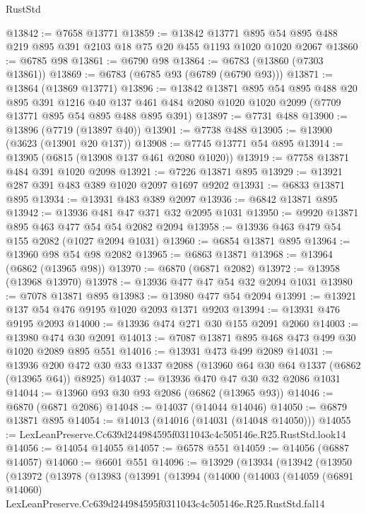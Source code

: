 \begin{lexlean}{RustStd}
\begin{coremodule}
@13842 := @7658 @13771
@13859 := @13842
    @13771
    @895
    @54
    @895
    @488
    @219
    @895
    @391
    @2103
    @18
    @75
    @20
    @455
    @1193
    @1020
    @1020
    @2067
@13860 := @6785 @98
@13861 := @6790 @98
@13864 := @6783 (@13860 (@7303 @13861))
@13869 := @6783 (@6785 @93 (@6789 (@6790 @93)))
@13871 := @13864 (@13869 @13771)
@13896 := @13842
    @13871
    @895
    @54
    @895
    @488
    @20
    @895
    @391
    @1216
    @40
    @137
    @461
    @484
    @2080
    @1020
    @1020
    @2099
    (@7709 @13771 @895 @54 @895 @488 @895 @391)
@13897 := @7731 @488
@13900 := @13896 (@7719 (@13897 @40))
@13901 := @7738 @488
@13905 := @13900 (@3623 (@13901 @20 @137))
@13908 := @7745 @13771 @54 @895
@13914 := @13905 (@6815 (@13908 @137 @461 @2080 @1020))
@13919 := @7758 @13871 @484 @391 @1020 @2098
@13921 := @7226 @13871 @895
@13929 := @13921 @287 @391 @483 @389 @1020 @2097 @1697 @9202
@13931 := @6833 @13871 @895
@13934 := @13931 @483 @389 @2097
@13936 := @6842 @13871 @895
@13942 := @13936 @481 @47 @371 @32 @2095 @1031
@13950 := @9920 @13871 @895 @463 @477 @54 @54 @2082 @2094
@13958 := @13936 @463 @479 @54 @155 @2082 (@1027 @2094 @1031)
@13960 := @6854 @13871 @895
@13964 := @13960 @98 @54 @98 @2082
@13965 := @6863 @13871
@13968 := @13964 (@6862 (@13965 @98))
@13970 := @6870 (@6871 @2082)
@13972 := @13958 (@13968 @13970)
@13978 := @13936 @477 @47 @54 @32 @2094 @1031
@13980 := @7078 @13871 @895
@13983 := @13980 @477 @54 @2094
@13991 := @13921 @137 @54 @476 @9195 @1020 @2093 @1371 @9203
@13994 := @13931 @476 @9195 @2093
@14000 := @13936 @474 @271 @30 @155 @2091 @2060
@14003 := @13980 @474 @30 @2091
@14013 := @7087 @13871 @895 @468 @473 @499 @30 @1020 @2089 @895 @551
@14016 := @13931 @473 @499 @2089
@14031 := @13936 @200 @472 @30 @33 @1337 @2088 (@13960 @64 @30 @64 @1337 (@6862 (@13965 @64)) @8925)
@14037 := @13936 @470 @47 @30 @32 @2086 @1031
@14044 := @13960 @93 @30 @93 @2086 (@6862 (@13965 @93))
@14046 := @6870 (@6871 @2086)
@14048 := @14037 (@14044 @14046)
@14050 := @6879 @13871 @895
@14054 := @14013 (@14016 (@14031 (@14048 @14050)))
@14055 := LexLeanPreserve.Cc639d244984595f0311043c4c505146e.R25.RustStd.look14
@14056 := @14054 @14055
@14057 := @6578 @551
@14059 := @14056 (@6887 @14057)
@14060 := @6601 @551
@14096 := @13929
    (@13934
      (@13942
        (@13950
          (@13972
            (@13978
              (@13983
                (@13991
                  (@13994
                    (@14000
                      (@14003
                        (@14059
                          (@6891 @14060)
                          LexLeanPreserve.Cc639d244984595f0311043c4c505146e.R25.RustStd.fal14

\end{coremodule}
\end{lexlean}
